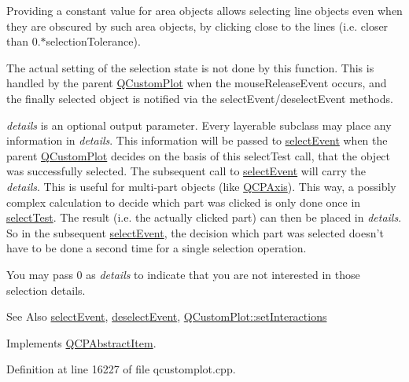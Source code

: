 Providing a constant value for area objects allows selecting line objects even when they are obscured by such area objects, by clicking close to the lines (i.\-e. closer than 0.$\ast$selection\-Tolerance).

The actual setting of the selection state is not done by this function. This is handled by the parent \hyperlink{class_q_custom_plot}{Q\-Custom\-Plot} when the mouse\-Release\-Event occurs, and the finally selected object is notified via the select\-Event/deselect\-Event methods.

{\itshape details} is an optional output parameter. Every layerable subclass may place any information in {\itshape details}. This information will be passed to \hyperlink{class_q_c_p_abstract_item_aaf92af7b9893712959a6c073d334d88d}{select\-Event} when the parent \hyperlink{class_q_custom_plot}{Q\-Custom\-Plot} decides on the basis of this select\-Test call, that the object was successfully selected. The subsequent call to \hyperlink{class_q_c_p_abstract_item_aaf92af7b9893712959a6c073d334d88d}{select\-Event} will carry the {\itshape details}. This is useful for multi-\/part objects (like \hyperlink{class_q_c_p_axis}{Q\-C\-P\-Axis}). This way, a possibly complex calculation to decide which part was clicked is only done once in \hyperlink{class_q_c_p_item_tracer_ae71f3728421c83c188c117279ca050fd}{select\-Test}. The result (i.\-e. the actually clicked part) can then be placed in {\itshape details}. So in the subsequent \hyperlink{class_q_c_p_abstract_item_aaf92af7b9893712959a6c073d334d88d}{select\-Event}, the decision which part was selected doesn't have to be done a second time for a single selection operation.

You may pass 0 as {\itshape details} to indicate that you are not interested in those selection details.

\begin{DoxySeeAlso}{See Also}
\hyperlink{class_q_c_p_abstract_item_aaf92af7b9893712959a6c073d334d88d}{select\-Event}, \hyperlink{class_q_c_p_abstract_item_a91f090d6763cfedb0749219c63788ae9}{deselect\-Event}, \hyperlink{class_q_custom_plot_a5ee1e2f6ae27419deca53e75907c27e5}{Q\-Custom\-Plot\-::set\-Interactions} 
\end{DoxySeeAlso}


Implements \hyperlink{class_q_c_p_abstract_item_a96d522d10ffc0413b9a366c6f7f0476b}{Q\-C\-P\-Abstract\-Item}.



Definition at line 16227 of file qcustomplot.\-cpp.

